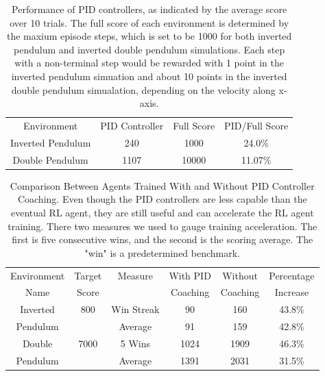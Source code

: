 \documentclass[smallextended]{svjour3}
\begin{document}

\begin{table}
\footnotesize
\caption{Performance of PID controllers, as indicated by the average score over 10 trials. The full score of each environment is determined by the maxium episode steps, which is set to be 1000 for both inverted pendulum and inverted double pendulum simulations. Each step with a non-terminal step would be rewarded with 1 point in the inverted pendulum simuation and about 10 points in the inverted double pendulum simualation, depending on the velocity along x-axis.}
\label{score_compare}
\centering
\begin{tabular}{ cccc }
\rowcolor{airforceblue}
Environment &   PID Controller &Full Score &PID\slash Full Score \\
Inverted Pendulum &  240 & 1000&  24.0\%\\
\rowcolor{beaublue}

Double Pendulum &  1107 & 10000& 11.07\%\\
\end{tabular}
\end{table}


\begin{table}
\scriptsize
\caption{Comparison Between Agents Trained With and Without PID Controller Coaching. Even though the PID controllers are less capable than the eventual RL agent, they are still useful and can accelerate the RL agent training. There two measures we used to gauge training acceleration. The first is five consecutive wins, and the second is the scoring average. The "win" is a predetermined benchmark. }
\label{episode_compare}
\centering
\begin{tabular}{ cccccc }
\rowcolor{airforceblue}

Environment & Target & Measure  &  With PID  & Without  & Percentage\\
\rowcolor{airforceblue}

   Name     & Score  &              & Coaching  & Coaching  & Increase \\
Inverted & 800& Win Streak & 90 & 160&  43.8\% \\
Pendulum & &Average  & 91 &  159&  42.8\%\\
\rowcolor{beaublue}
Double & 7000& 5 Wins & 1024 & 1909&  46.3\%\\
\rowcolor{beaublue}
Pendulum & &Average & 1391 &  2031&  31.5\%\\

\end{tabular}
\end{table}
\end{document}
